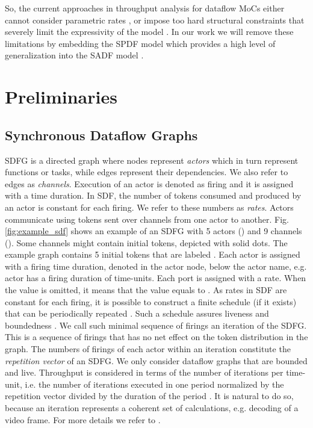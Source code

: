 \documentclass[]{eptcs}
\begin{document}
So, the current approaches in throughput analysis for dataflow MoCs either cannot consider parametric rates \cite{2gha:all}\cite{3gha:all}\cite{2geil:all}\cite{2dam:all}, or impose too hard structural constraints that severely limit the expressivity of the model \cite{2wigg}. In our work we will remove these limitations by embedding the SPDF model \cite{2frad:all} which provides a high level of generalization into the SADF model \cite{2thel:all}\cite{2geil:all}.
\section{Preliminaries}
\subsection{Synchronous Dataflow Graphs}
SDFG is a directed graph  where nodes represent \textit{actors} which in turn represent functions or tasks, while edges represent their dependencies. We also refer to edges as \textit{channels}. Execution of an actor is denoted as firing and it is assigned with a time duration. In SDF, the number of tokens consumed and produced by an actor is constant for each firing. We refer to these numbers as \textit{rates}. Actors communicate using tokens sent over channels from one actor to another.
Fig. \ref{fig:example_sdf} shows an example of an SDFG with 5 actors () and 9 channels (). Some channels might contain initial tokens, depicted with solid dots. The example graph contains 5 initial tokens that are labeled . Each actor is assigned with a firing time duration, denoted in the actor node, below the actor name, e.g. actor  has a firing duration of  time-units. Each port is assigned with a rate. When the value is omitted, it means that the value equals to . 
As rates in SDF are constant for each firing, it is possible to construct a finite schedule (if it exists) that can be periodically repeated \cite{2lee:all}. Such a schedule assures liveness and boundedness \cite{2lee:all}. We call such minimal sequence of firings an iteration of the SDFG. This is a sequence of firings that has no net effect on the token distribution in the graph. The numbers of firings of each actor within an iteration constitute the \textit{repetition vector} of an SDFG. We only consider dataflow graphs that are bounded and live. Throughput is considered in terms of the number of iterations per time-unit, i.e. the number of iterations executed in one period normalized by the repetition vector divided by the duration of the period \cite{2gha:all}. It is natural to do so, because an iteration represents a coherent set of calculations, e.g. decoding of a video frame. For more details we refer to \cite{2lee:all}\cite{2gha:all}.
\end{document}
